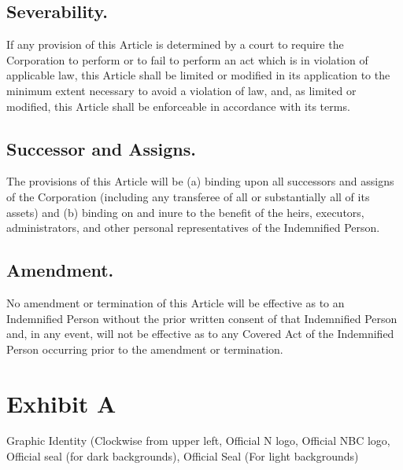\documentclass[11pt,american,letterpaper,]{constitution}
\begin{document}
\subsection{Severability.} 

If any provision of this Article is determined by a court to require the Corporation to perform or to fail to perform an act which is in violation of applicable law, this Article shall be limited or modified in its application to the minimum extent necessary to avoid a violation of law, and, as limited or modified, this Article shall be enforceable in accordance with its terms.

\subsection{Successor and Assigns.} 

The provisions of this Article will be (a) binding upon all successors and assigns of the Corporation (including any transferee of all or substantially all of its assets) and (b) binding on and inure to the benefit of the heirs, executors, administrators, and other personal representatives of the Indemnified Person.

\subsection{Amendment.} 

No amendment or termination of this Article will be effective as to an Indemnified Person without the prior written consent of that Indemnified Person and, in any event, will not be effective as to any Covered Act of the Indemnified Person occurring prior to the amendment or termination.

\newpage
\appendix

\section{Exhibit A}

Graphic Identity (Clockwise from upper left, Official N logo, Official NBC
logo, Official seal (for dark backgrounds), Official Seal (For light backgrounds)
\end{document}
